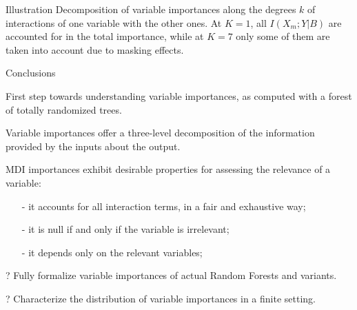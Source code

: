 \documentclass[final]{beamer}
\newcommand{\cmark}{\ding{51}}%
\begin{document}
\begin{frame}{}
\begin{textblock}{0.32}
\begin{block}{Illustration \phantom{p}}
Decomposition of variable importances along the
degrees $k$ of interactions of one variable with the other ones. At $K=1$, all
$I(X_m;Y|B)$ are accounted for in the total importance, while at $K=7$ only
some of them are taken into account due to masking effects.


\end{block}

\vspace{0.5cm}
\begin{block}{Conclusions \phantom{p}}

{\color{green} \cmark} First step towards understanding variable importances, as computed with a forest of totally randomized trees.

{\color{green} \cmark} Variable importances offer a three-level decomposition of the information provided by the inputs about the output.

{\color{green} \cmark} MDI importances exhibit desirable properties for assessing the relevance of a variable:
\begin{itemize}
\item[-] it accounts for all interaction terms, in a fair and exhaustive way;
\item[-] it is null if and only if the variable is irrelevant;
\item[-] it depends only on the relevant variables;
\end{itemize}

{\color{blue} ?} Fully formalize variable importances of actual Random Forests and variants.

{\color{blue} ?} Characterize the distribution of variable importances in a finite setting.


\end{block}

\end{textblock}




\end{frame}
\end{document}
